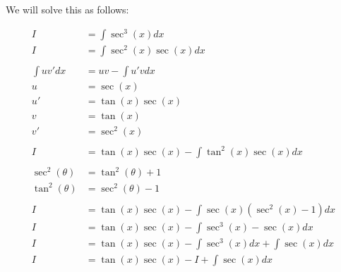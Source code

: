 \documentclass[12pt]{article}
\begin{document}
We will solve this as follows:


\begin{align}
    I              & = \int \sec^3(x) dx                                                         \\
    I              & = \int \sec^2(x)\sec(x) dx                                                  \\
    \nonumber                                                                                    \\
    \int uv' dx    & = uv - \int u'v dx                                                          \\
    u              & = \sec(x)                                                                   \\
    u'             & = \tan(x)\sec(x)                                                            \\
    v              & = \tan(x)                                                                   \\
    v'             & = \sec^2(x)                                                                 \\
    \nonumber                                                                                    \\
    I              & = \tan(x)\sec(x) - \int \tan^2(x)\sec(x) dx                                 \\
    \nonumber                                                                                    \\
    \sec^2(\theta) & = \tan^2(\theta) + 1                                                        \\
    \tan^2(\theta) & = \sec^2(\theta) - 1                                                        \\
    \nonumber                                                                                    \\
    I              & = \tan(x)\sec(x) - \int \sec(x)(\sec^2(x) - 1) dx                           \\
    I              & = \tan(x)\sec(x) - \int \sec^3(x) - \sec(x) dx                              \\
    I              & = \tan(x)\sec(x) - \int \sec^3(x) dx + \int \sec(x) dx                      \\
    I              & = \tan(x)\sec(x) - I + \int \sec(x) dx                                      \\

\end{align}
\end{document}
